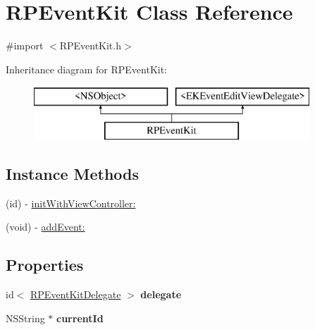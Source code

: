 \hypertarget{interface_r_p_event_kit}{\section{R\-P\-Event\-Kit Class Reference}
\label{interface_r_p_event_kit}
}


{\ttfamily \#import $<$R\-P\-Event\-Kit.\-h$>$}

Inheritance diagram for R\-P\-Event\-Kit\-:\begin{figure}[H]
\begin{center}
\leavevmode
\includegraphics[height=2.000000cm]{interface_r_p_event_kit}
\end{center}
\end{figure}
\subsection*{Instance Methods}
\begin{DoxyCompactItemize}
\item 
(id) -\/ \hyperlink{interface_r_p_event_kit_a1b0e9104c95e6ab17dfcd0921c21cbdc}{init\-With\-View\-Controller\-:}
\item 
(void) -\/ \hyperlink{interface_r_p_event_kit_a13d55be4ee4772081376e5e9232f2e1b}{add\-Event\-:}
\end{DoxyCompactItemize}
\subsection*{Properties}
\begin{DoxyCompactItemize}
\item 
\hypertarget{interface_r_p_event_kit_abeb5cf5feeff93d620e56e371cdec494}{id$<$ \hyperlink{protocol_r_p_event_kit_delegate-p}{R\-P\-Event\-Kit\-Delegate} $>$ {\bfseries delegate}}\label{interface_r_p_event_kit_abeb5cf5feeff93d620e56e371cdec494}

\item 
\hypertarget{interface_r_p_event_kit_a8a654ba07676e7973a3d97bebe3ef36c}{N\-S\-String $\ast$ {\bfseries current\-Id}}\label{interface_r_p_event_kit_a8a654ba07676e7973a3d97bebe3ef36c}

\end{DoxyCompactItemize}


